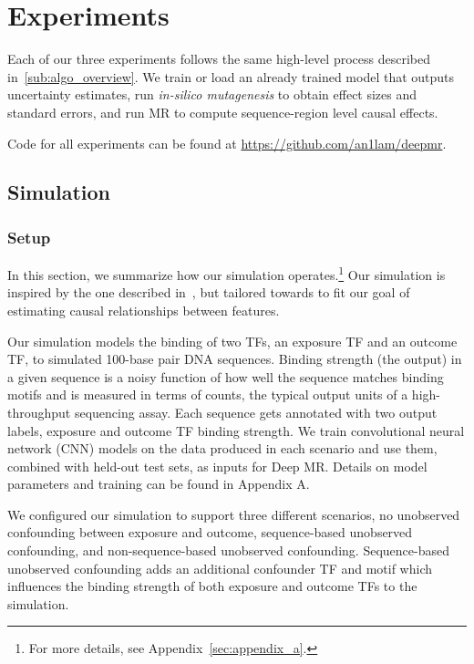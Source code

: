 \section{Experiments}
Each of our three experiments follows the same high-level process described in~\ref{sub:algo_overview}. We train or load an already trained model that outputs uncertainty estimates, run \textit{in-silico mutagenesis} to obtain effect sizes and standard errors, and run MR to compute sequence-region level causal effects.

Code for all experiments can be found at \url{https://github.com/an1lam/deepmr}.

\subsection{Simulation}%
\label{sub:res_simulation}

\subsubsection{Setup}%
\label{ssub:sim_setup}
In this section, we summarize how our simulation operates.\footnote{For more details, see Appendix~\ref{sec:appendix_a}.} Our simulation is inspired by the one described in~\cite{finkelstein2020look}, but tailored towards to fit our goal of estimating causal relationships between features.

Our simulation models the binding of two TFs, an exposure TF and an outcome TF, to simulated 100-base pair DNA sequences. Binding strength (the output) in a given sequence is a noisy function of how well the sequence matches binding motifs and is measured in terms of counts, the typical output units of a high-throughput sequencing assay. Each sequence gets annotated with two output labels, exposure and outcome TF binding strength. We train convolutional neural network (CNN) models on the data produced in each scenario and use them, combined with held-out test sets, as inputs for Deep MR. Details on model parameters and training can be found in Appendix A.

We configured our simulation to support three different scenarios, no unobserved confounding between exposure and outcome, sequence-based unobserved confounding, and non-sequence-based unobserved confounding. Sequence-based unobserved confounding adds an additional confounder TF and motif which influences the binding strength of both exposure and outcome TFs to the simulation.


